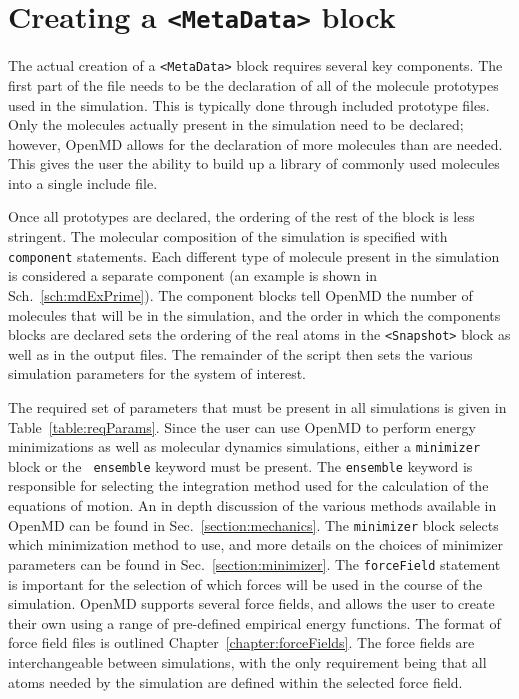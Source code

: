 \documentclass[letterpaper]{report}
\begin{document}
\section{\label{sec:miscConcepts}Creating a {\tt <MetaData>} block}

The actual creation of a {\tt <MetaData>} block requires several key
components. The first part of the file needs to be the declaration of
all of the molecule prototypes used in the simulation. This is
typically done through included prototype files. Only the molecules
actually present in the simulation need to be declared; however,
OpenMD allows for the declaration of more molecules than are
needed. This gives the user the ability to build up a library of
commonly used molecules into a single include file.

Once all prototypes are declared, the ordering of the rest of the
block is less stringent.  The molecular composition of the simulation
is specified with {\tt component} statements. Each different type of
molecule present in the simulation is considered a separate
component (an example is shown in
Sch.~\ref{sch:mdExPrime}).  The component blocks tell OpenMD the
number of molecules that will be in the simulation, and the order in
which the components blocks are declared sets the ordering of the real
atoms in the {\tt <Snapshot>} block as well as in the output files. The
remainder of the script then sets the various simulation parameters
for the system of interest.

The required set of parameters that must be present in all simulations
is given in Table~\ref{table:reqParams}.  Since the user can use 
OpenMD to perform energy minimizations as well as molecular
dynamics simulations, either a {\tt minimizer} block or the {\tt
  ensemble} keyword must be present.  The {\tt ensemble} keyword is
responsible for selecting the integration method used for the
calculation of the equations of motion. An in depth discussion of the
various methods available in OpenMD can be found in
Sec.~\ref{section:mechanics}.  The {\tt minimizer} block selects which
minimization method to use, and more details on the choices of
minimizer parameters can be found in Sec.~\ref{section:minimizer}. The
{\tt forceField} statement is important for the selection of which
forces will be used in the course of the simulation. OpenMD
supports several force fields, and allows the user to create their own
using a range of pre-defined empirical energy functions.  The format
of force field files is outlined
Chapter~\ref{chapter:forceFields}. The force fields are
interchangeable between simulations, with the only requirement being
that all atoms needed by the simulation are defined within the
selected force field.
\end{document}
